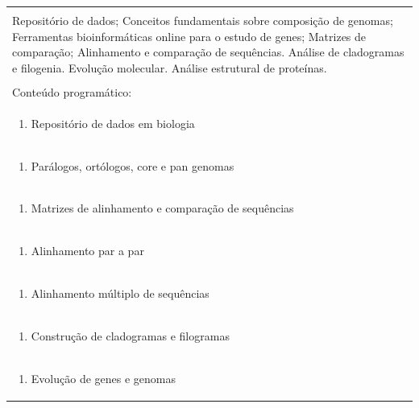 \documentclass[11pt]{article}
\begin{document}
\begin{center}
\begin{longtable}{|p{4cm}|p{4cm}|p{4cm}|p{4cm}|}
\multicolumn{4}{|p{16cm}|}{}\\
\multicolumn{4}{|p{\dimexpr 16cm + 6\tabcolsep\relax}|}{Repositório de dados; Conceitos fundamentais sobre composição de genomas; Ferramentas bioinformáticas online para o estudo de genes; Matrizes de comparação; Alinhamento e comparação de sequências. Análise de cladogramas e filogenia. Evolução molecular. Análise estrutural de proteínas.}\\
\multicolumn{4}{|p{16cm}|}{}\\
\hline
\multicolumn{4}{|p{16cm}|}{Conteúdo programático:}\\*
\multicolumn{4}{|p{\dimexpr 16cm + 6\tabcolsep\relax}|}{\begin{enumerate}[start=1]\item Repositório de dados em biologia\end{enumerate}}\\
\multicolumn{4}{|p{\dimexpr 16cm + 6\tabcolsep\relax}|}{\begin{enumerate}[start=2]\item Parálogos, ortólogos, core e pan genomas\end{enumerate}}\\
\multicolumn{4}{|p{\dimexpr 16cm + 6\tabcolsep\relax}|}{\begin{enumerate}[start=3]\item Matrizes de alinhamento e comparação de sequências\end{enumerate}}\\
\multicolumn{4}{|p{\dimexpr 16cm + 6\tabcolsep\relax}|}{\begin{enumerate}[start=4]\item Alinhamento par a par\end{enumerate}}\\
\multicolumn{4}{|p{\dimexpr 16cm + 6\tabcolsep\relax}|}{\begin{enumerate}[start=5]\item Alinhamento múltiplo de sequências\end{enumerate}}\\
\multicolumn{4}{|p{\dimexpr 16cm + 6\tabcolsep\relax}|}{\begin{enumerate}[start=6]\item Construção de cladogramas e filogramas\end{enumerate}}\\
\multicolumn{4}{|p{\dimexpr 16cm + 6\tabcolsep\relax}|}{\begin{enumerate}[start=7]\item Evolução de genes e genomas\end{enumerate}}\\

\end{longtable}
\end{center}
\end{document}
